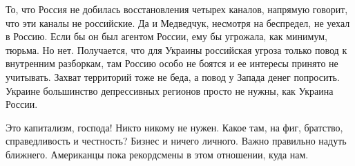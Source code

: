 То, что Россия не добилась восстановления четырех каналов, напрямую говорит,
что эти каналы не российские. Да и Медведчук, несмотря на беспредел, не уехал в
Россию. Если бы он был агентом России, ему бы угрожала, как минимум, тюрьма. Но
нет. Получается, что для Украины российская угроза только повод к внутренним
разборкам, там Россию особо не боятся и ее интересы принято не учитывать.
Захват территорий тоже не беда, а повод у Запада денег попросить. Украине
большинство депрессивных регионов просто не нужны, как Украина России. 

Это капитализм, господа! Никто никому не нужен. Какое там, на фиг, братство,
справедливость и честность? Бизнес и ничего личного. Важно правильно надуть
ближнего. Американцы пока рекордсмены в этом отношении, куда нам.

